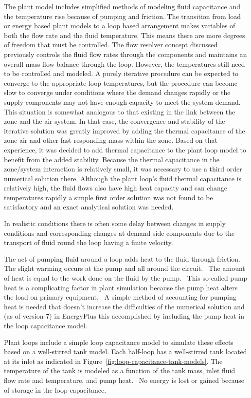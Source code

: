 The plant model includes simplified methods of modeling fluid capacitance and the temperature rise because of pumping and friction. The transition from load or energy based plant models to a loop based arrangement makes variables of both the flow rate and the fluid temperature. This means there are more degrees of freedom that must be controlled. The flow resolver concept discussed previously controls the fluid flow rates through the components and maintains an overall mass flow balance through the loop. However, the temperatures still need to be controlled and modeled. A purely iterative procedure can be expected to converge to the appropriate loop temperatures, but the procedure can become slow to converge under conditions where the demand changes rapidly or the supply components may not have enough capacity to meet the system demand. This situation is somewhat analogous to that existing in the link between the zone and the air system. In that case, the convergence and stability of the iterative solution was greatly improved by adding the thermal capacitance of the zone air and other fast responding mass within the zone. Based on that experience, it was decided to add thermal capacitance to the plant loop model to benefit from the added stability. Because the thermal capacitance in the zone/system interaction is relatively small, it was necessary to use a third order numerical solution there. Although the plant loop's fluid thermal capacitance is relatively high, the fluid flows also have high heat capacity and can change temperatures rapidly a simple first order solution was not found to be satisfactory and an exact analytical solution was needed.

In realistic conditions there is often some delay between changes in supply conditions and corresponding changes at demand side components due to the transport of fluid round the loop having a finite velocity.

The act of pumping fluid around a loop adds heat to the fluid through friction.~ The slight warming occurs at the pump and all around the circuit.~ The amount of heat is equal to the work done on the fluid by the pump.~ This so-called pump heat is a complicating factor in plant simulation because the pump heat alters the load on primary equipment.~ A simple method of accounting for pumping heat is needed that doesn't increase the difficulties of the numerical solution and (as of version 7) in EnergyPlus this accomplished by including the pump heat in the loop capacitance model.

Plant loops include a simple loop capacitance model to simulate these effects based on a well-stirred tank model. Each half-loop has a well-stirred tank located at its inlet as indicated in Figure~\ref{fig:loop-capacitance-tank-models}. The temperature of the tank is modeled as a function of the tank mass, inlet fluid flow rate and temperature, and pump heat.~ No energy is lost or gained because of storage in the loop capacitance.

